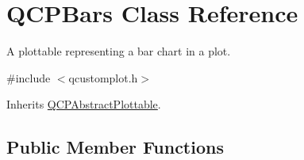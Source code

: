 \hypertarget{class_q_c_p_bars}{\section{Q\-C\-P\-Bars Class Reference}
\label{class_q_c_p_bars}
}


A plottable representing a bar chart in a plot.  




{\ttfamily \#include $<$qcustomplot.\-h$>$}



Inherits \hyperlink{class_q_c_p_abstract_plottable}{Q\-C\-P\-Abstract\-Plottable}.

\subsection*{Public Member Functions}
